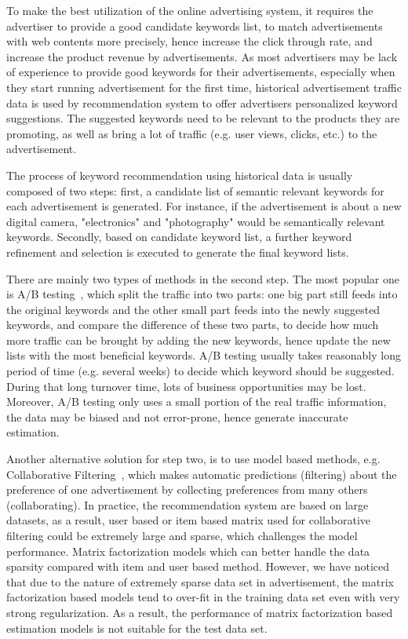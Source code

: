 \documentclass[conference,compsoc]{IEEEtran}
\begin{document}
To make the best utilization of the online advertising system, it requires the advertiser to provide a good candidate keywords list, to match advertisements with web contents more precisely, hence increase the click through rate, and increase the product revenue by advertisements. As most advertisers may be lack of experience to provide good keywords for their advertisements, especially when they start running advertisement for the first time, historical advertisement traffic data is used by recommendation system to offer advertisers personalized keyword suggestions. The suggested keywords need to be relevant to the products they are promoting, as well as bring a lot of traffic (e.g. user views, clicks, etc.) to the advertisement. 


The process of keyword recommendation using historical data is usually composed of two steps: first, a candidate list of semantic relevant keywords for each advertisement is generated. For instance, if the advertisement is about a new digital camera, "electronics" and "photography" would be semantically relevant keywords. Secondly, based on candidate keyword list, a further keyword refinement and selection is executed to generate the final keyword lists.  

There are mainly two types of methods in the second step.  The most popular one is A/B testing~\cite{abtest:wiki}, which split the traffic into two parts: one big part still feeds into the original keywords and the other small part feeds into the newly suggested keywords, and compare the difference of these two parts, to decide how much more traffic can be brought by adding the new keywords, hence update the new lists with the most beneficial keywords. A/B testing usually takes reasonably long period of time (e.g. several weeks) to decide which keyword should be suggested. During that long turnover time,  lots of business opportunities may be lost. Moreover, A/B testing only uses a small portion of the real traffic information, the data may be biased and not error-prone, hence generate inaccurate estimation. 

%
Another alternative solution for step two, is to use model based methods, e.g. Collaborative Filtering~\cite{resnick1997recommender, sarwar2001item}, which makes automatic predictions (filtering) about the preference of one advertisement by collecting preferences from many others (collaborating). In practice, the recommendation system are based on large datasets, as a result, user based or item based matrix used for collaborative filtering could be extremely large and sparse, which challenges the model performance. Matrix factorization models \cite{??} which can better handle the data sparsity compared with item and user based method. 
However, we have noticed that due to the nature of extremely sparse data set in advertisement,  the matrix factorization based models tend to over-fit in the training data set even with very strong regularization. As a result, the performance of matrix factorization based estimation models is not suitable for the test data set.
\end{document}
